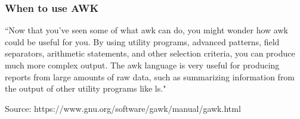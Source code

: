 \documentclass[xcolor=svgnames]{beamer}
\begin{document}
\begin{frame}
    \frametitle{When to use AWK}
    ``Now that you’ve seen some of what awk can do, you might wonder how awk could be useful for you. By using utility programs, advanced patterns, field separators, arithmetic statements, and other selection criteria, you can produce much more complex output. The awk language is very useful for producing reports from large amounts of raw data, such as summarizing information from the output of other utility programs like ls."\\
    \vspace{2cm}
    \begin{center}
        \tiny{Source: https://www.gnu.org/software/gawk/manual/gawk.html}
    \end{center}

\end{frame}
\end{document}
